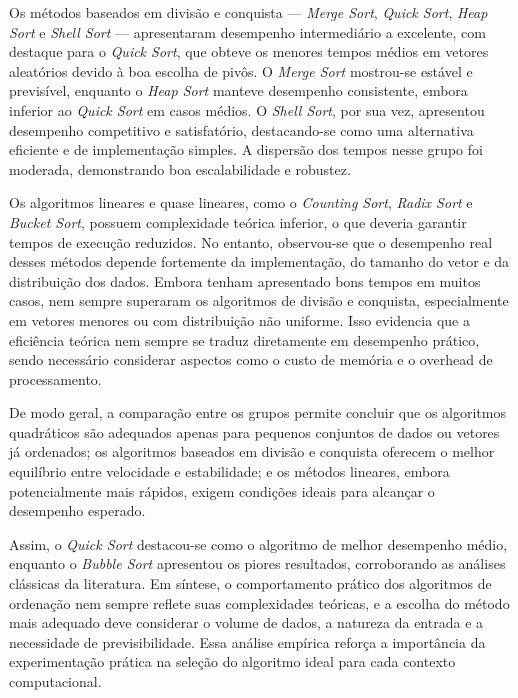 \documentclass[
	article,			%
	11pt,				%
	oneside,			%
	a4paper,			%
	english,			%
	brazil,				%
	sumario=tradicional
	]{abntex2}
\begin{document}
Os métodos baseados em divisão e conquista — \textit{Merge Sort}, \textit{Quick Sort}, \textit{Heap Sort} e \textit{Shell Sort} — apresentaram desempenho intermediário a excelente, com destaque para o \textit{Quick Sort}, que obteve os menores tempos médios em vetores aleatórios devido à boa escolha de pivôs. O \textit{Merge Sort} mostrou-se estável e previsível, enquanto o \textit{Heap Sort} manteve desempenho consistente, embora inferior ao \textit{Quick Sort} em casos médios. O \textit{Shell Sort}, por sua vez, apresentou desempenho competitivo e satisfatório, destacando-se como uma alternativa eficiente e de implementação simples. A dispersão dos tempos nesse grupo foi moderada, demonstrando boa escalabilidade e robustez.

Os algoritmos lineares e quase lineares, como o \textit{Counting Sort}, \textit{Radix Sort} e \textit{Bucket Sort}, possuem complexidade teórica inferior, o que deveria garantir tempos de execução reduzidos. No entanto, observou-se que o desempenho real desses métodos depende fortemente da implementação, do tamanho do vetor e da distribuição dos dados. Embora tenham apresentado bons tempos em muitos casos, nem sempre superaram os algoritmos de divisão e conquista, especialmente em vetores menores ou com distribuição não uniforme. Isso evidencia que a eficiência teórica nem sempre se traduz diretamente em desempenho prático, sendo necessário considerar aspectos como o custo de memória e o overhead de processamento.

De modo geral, a comparação entre os grupos permite concluir que os algoritmos quadráticos são adequados apenas para pequenos conjuntos de dados ou vetores já ordenados; os algoritmos baseados em divisão e conquista oferecem o melhor equilíbrio entre velocidade e estabilidade; e os métodos lineares, embora potencialmente mais rápidos, exigem condições ideais para alcançar o desempenho esperado.

Assim, o \textit{Quick Sort} destacou-se como o algoritmo de melhor desempenho médio, enquanto o \textit{Bubble Sort} apresentou os piores resultados, corroborando as análises clássicas da literatura. Em síntese, o comportamento prático dos algoritmos de ordenação nem sempre reflete suas complexidades teóricas, e a escolha do método mais adequado deve considerar o volume de dados, a natureza da entrada e a necessidade de previsibilidade. Essa análise empírica reforça a importância da experimentação prática na seleção do algoritmo ideal para cada contexto computacional.


\end{document}
